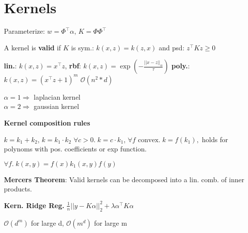 \section*{Kernels}

Parameterize: $w = \Phi^\top \alpha$, $K = \Phi \Phi^\top$

A kernel is \textbf{valid} if $K$ is sym.: $k(x,z) = k(z,x)$ and psd: $z^\top K z \geq 0$

\textbf{lin.}: $k(x, z) = x^\top z$, 
\textbf{rbf}: $k(x, z) = \exp ( -\frac{||x - z||_\alpha}{\tau} )$
\textbf{poly.}: $k(x, z) = (x^\top z + 1)^m$ $\mathcal{O}(n^2 * d)$

$\alpha = 1 \Rightarrow $ laplacian kernel \\
$\alpha = 2 \Rightarrow $ gaussian kernel

\textbf{Kernel composition rules}

$k = k_1 + k_2$, \quad $k = k_1 \cdot k_2$ \quad $\forall c > 0. \; k = c \cdot k_1$,
$\forall f \text{ convex}. \; k = f(k_1), $ holds for polynoms with pos. coefficients or exp function. 

$\forall f. \; k(x,y) = f(x)k_1(x,y)f(y)$

\textbf{Mercers Theorem}: Valid kernels can be decomposed into a lin. comb. of inner products.

\textbf{Kern. Ridge Reg.}
$\frac{1}{n} ||y - K\alpha ||_2^2 + \lambda \alpha^\top K \alpha$

$\mathcal{O}(d^m)$ for large d, $\mathcal{O}(m^d)$ for large  m
